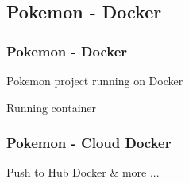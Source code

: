 \documentclass{beamer}
\begin{document}
\subsection{Pokemon - Docker} 
\begin{frame}\frametitle{Pokemon - Docker} 

Pokemon project running on Docker
  
\begin{block}{Running container}
  \lstpokemondocker
\end{block}

\end{frame}

\begin{frame}\frametitle{Pokemon - Cloud Docker} 
\begin{block}{Push to Hub Docker \& more ...}
  \lstpokemonhub
\end{block}

\end{frame}
\end{document}
